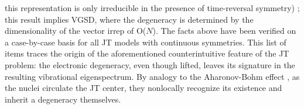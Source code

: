 \documentclass[superscriptaddress,showpacs,amsmath,amssymb,pra,twocolumn]{revtex4-1}
\begin{document}
this representation is only irreducible in the presence of time-reversal
symmetry) \cite{barut1986theory}; this result implies VGSD, where
the degeneracy is determined by the dimensionality of the vector irrep
of O($N$). The facts above have been verified on a case-by-case basis
for all JT models with continuous symmetries\cite{obrien_dynamic_1969-2,judd_jahnteller_1984,ham_berrys_1987,zwanziger_topological_1987,auerbach_vibrations_1994,cullerne_jahn-teller_1994,de_los_rios_dynamical_1996,chancey1997jahn}.
This list of items traces the origin of the aforementioned counterintuitive
feature of the JT problem: the electronic degeneracy, even though
lifted, leaves its signature in the resulting vibrational eigenspectrum.
By analogy to the Aharonov-Bohm effect \cite{aharonov_significance_1959}, as the nuclei circulate
the JT center, they nonlocally recognize its existence and inherit
a degeneracy themselves. 
\end{document}
